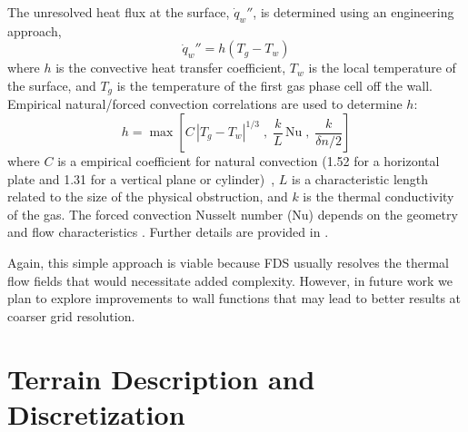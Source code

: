 \documentclass[journal,article,atmosphere,submit,moreauthors,pdftex]{Definitions/mdpi}
\begin{document}
The unresolved heat flux at the surface, $\dot{q}_w''$, is determined using an engineering approach,
\begin{equation}
\dot{q}_w'' = h (T_g - T_w) 
\end{equation}
where $h$ is the convective heat transfer coefficient, $T_w$ is the local temperature of the surface, and $T_g$ is the temperature of the first gas phase cell off the wall.  Empirical natural/forced convection correlations are used to determine $h$:
\begin{equation}
h = \max \left[C\, |T_g-T_w|^{1/3} \; , \;
\frac{k}{L} \, \mathrm{Nu} \; , \;
\frac{k}{\delta n/2} \right]
\label{eq:qconv}
\end{equation}
where $C$ is a empirical coefficient for natural convection (1.52 for a horizontal plate and 1.31 for a vertical plane or cylinder)~\cite{Holman:1}, $L$ is a characteristic length related to the size of the physical obstruction, and $k$ is the thermal conductivity of the gas. The forced convection Nusselt number (Nu) depends on the geometry and flow characteristics \cite{Holman:1,Incropera:1}.  Further details are provided in \cite{FDS_Math_Guide}.

Again, this simple approach is viable because FDS usually resolves the thermal flow fields that would necessitate added complexity.  However, in future work we plan to explore improvements to wall functions that may lead to better results at coarser grid resolution.


\section{Terrain Description and Discretization} \label{sec:terraindisc}
\end{document}
